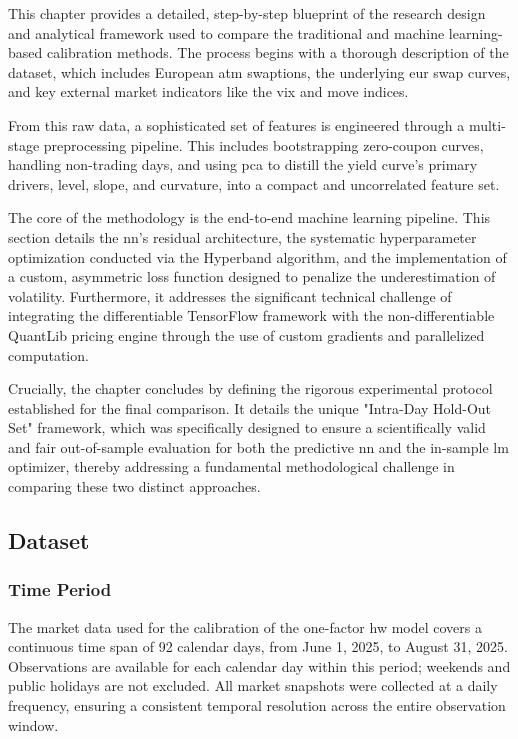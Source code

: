 This chapter provides a detailed, step-by-step blueprint of the research design and analytical framework used to compare the traditional and machine learning-based calibration methods. The process begins with a thorough description of the dataset, which includes European \ac{atm} swaptions, the underlying \ac{eur} swap curves, and key external market indicators like the \ac{vix} and \ac{move} indices.

From this raw data, a sophisticated set of features is engineered through a multi-stage preprocessing pipeline. This includes bootstrapping zero-coupon curves, handling non-trading days, and using \ac{pca} to distill the yield curve's primary drivers, level, slope, and curvature, into a compact and uncorrelated feature set.

The core of the methodology is the end-to-end machine learning pipeline. This section details the \ac{nn}'s residual architecture, the systematic hyperparameter optimization conducted via the Hyperband algorithm, and the implementation of a custom, asymmetric loss function designed to penalize the underestimation of volatility. Furthermore, it addresses the significant technical challenge of integrating the differentiable TensorFlow framework with the non-differentiable QuantLib pricing engine through the use of custom gradients and parallelized computation.

Crucially, the chapter concludes by defining the rigorous experimental protocol established for the final comparison. It details the unique "Intra-Day Hold-Out Set" framework, which was specifically designed to ensure a scientifically valid and fair out-of-sample evaluation for both the predictive \ac{nn} and the in-sample \ac{lm} optimizer, thereby addressing a fundamental methodological challenge in comparing these two distinct approaches.

\subsection{Dataset}
\subsubsection{Time Period}
The market data used for the calibration of the one-factor \ac{hw} model covers a continuous time span of 92 calendar days, from June 1, 2025, to August 31, 2025. Observations are available for each calendar day within this period; weekends and public holidays are not excluded. All market snapshots were collected at a daily frequency, ensuring a consistent temporal resolution across the entire observation window.

